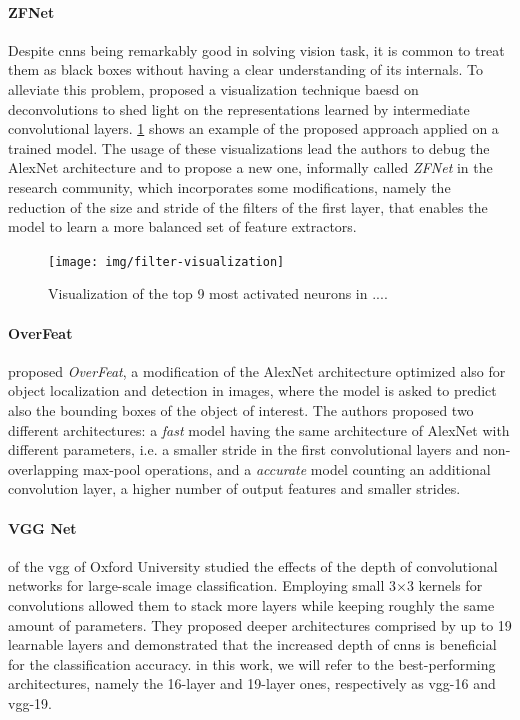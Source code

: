 \paragraph{ZFNet} Despite \glspl{cnn} being remarkably good in solving vision task, it is common to treat them as black boxes without having a clear understanding of its internals. %
To alleviate this problem, \citet{zeiler2014visualizing} proposed a visualization technique baesd on deconvolutions to shed light on the representations learned by intermediate convolutional layers.
\ref{fig:back:filter-visualization} shows an example of the proposed approach applied on a trained model.
The usage of these visualizations lead the authors to debug the AlexNet architecture and to propose a new one, informally called \emph{ZFNet} in the research community, which incorporates some modifications, namely the reduction of the size and stride of the filters of the first layer, that enables the model to learn a more balanced set of feature extractors.

\begin{figure}
    \centering
    \texttt{[image: img/filter-visualization]}
    \caption{Visualization of the top 9 most activated neurons in ....}
    \label{fig:back:filter-visualization}
\end{figure}

\paragraph{OverFeat} \citet{sermanet2013overfeat} proposed \emph{OverFeat}, a modification of the AlexNet architecture optimized also for object localization and detection in images, where the model is asked to predict also the bounding boxes of the object of interest.
The authors proposed two different architectures: a \emph{fast} model having the same architecture of AlexNet with different parameters, i.e. a smaller stride in the first convolutional layers and non-overlapping max-pool operations, and a \emph{accurate} model counting an additional convolution layer, a higher number of output features and smaller strides.

\paragraph{VGG Net} %
\citet{simonyan2014very} of the \gls{vgg} of Oxford University studied the effects of the depth of convolutional networks for large-scale image classification.
Employing small 3$\times$3 kernels for convolutions allowed them to stack more layers while keeping roughly the same amount of parameters.
They proposed deeper architectures comprised by up to 19 learnable layers and demonstrated that the increased depth of \glspl{cnn} is beneficial for the classification accuracy.
in this work, we will refer to the best-performing architectures, namely the 16-layer and 19-layer ones, respectively as \gls{vgg}-16 and \gls{vgg}-19.

